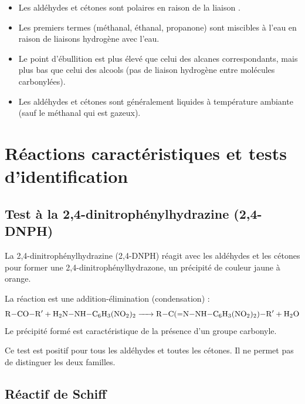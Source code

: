 \begin{propriete}
\begin{itemize}
    \item Les aldéhydes et cétones sont polaires en raison de la liaison .
    \item Les premiers termes (méthanal, éthanal, propanone) sont miscibles à l'eau en raison de liaisons hydrogène avec l'eau.
    \item Le point d'ébullition est plus élevé que celui des alcanes correspondants, mais plus bas que celui des alcools (pas de liaison hydrogène entre molécules carbonylées).
    \item Les aldéhydes et cétones sont généralement liquides à température ambiante (sauf le méthanal qui est gazeux).
\end{itemize}
\end{propriete}

\section{Réactions caractéristiques et tests d'identification}

\subsection{Test à la 2,4-dinitrophénylhydrazine (2,4-DNPH)}

\begin{experience}
La 2,4-dinitrophénylhydrazine (2,4-DNPH) réagit avec les aldéhydes et les cétones pour former une 2,4-dinitrophénylhydrazone, un précipité de couleur jaune à orange.
\end{experience}

\begin{propriete}
La réaction est une addition-élimination (condensation) :
\[
\ce{R-CO-R$'$ + H2N-NH-C6H3(NO2)2 -> R-C(=N-NH-C6H3(NO2)2)-R$'$ + H2O}
\]
Le précipité formé est caractéristique de la présence d'un groupe carbonyle.
\end{propriete}

\begin{remarque}
Ce test est positif pour tous les aldéhydes et toutes les cétones. Il ne permet pas de distinguer les deux familles.
\end{remarque}

\subsection{Réactif de Schiff}

